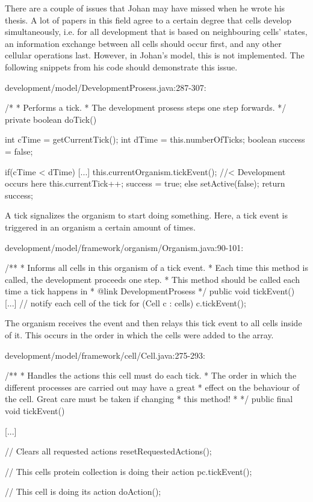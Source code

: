 There are a couple of issues that Johan may have missed when he wrote his thesis. A lot of papers in this field agree to a certain degree that cells develop simultaneously, i.e. for all development that is based on neighbouring cells' states, an information exchange between all cells should occur first, and any other cellular operations last. However, in Johan's model, this is not implemented. The following snippets from his code should demonstrate this issue.

\begin{verbatimtab}
development/model/DevelopmentProsess.java:287-307:

/*
 * Performs a tick.
 * The development prosess steps one step forwards.
 */
private boolean doTick() {
	int cTime = getCurrentTick();
	int dTime = this.numberOfTicks;
	boolean success = false;

	if(cTime < dTime) {
		[...]
		this.currentOrganism.tickEvent(); //< Development occurs here
		this.currentTick++;
		success = true;
	} else {
		setActive(false);
	}
	return success;
}
\end{verbatimtab}

A tick signalizes the organism to start doing something. Here, a tick event is triggered in an organism a certain amount of times.

\begin{verbatimtab}
development/model/framework/organism/Organism.java:90-101:

/**
 * Informs all cells in this organism of a tick event.
 * Each time this method is called, the development proceeds one step.
 * This method should be called each time a tick happens in
 * {@link DevelopmentProsess}
 */
public void tickEvent() {
	[...]
	// notify each cell of the tick
	for (Cell c : cells) {
		c.tickEvent();
	}
}
\end{verbatimtab}

The organism receives the event and then relays this tick event to all cells inside of it. This occurs in the order in which the cells were added to the array.

\begin{verbatimtab}
development/model/framework/cell/Cell.java:275-293:

/**
 * Handles the actions this cell must do each tick.
 * The order in which the different processes are carried out may have a great
 * effect on the behaviour of the cell. Great care must be taken if changing
 * this method!
 *
 */
public final void tickEvent() {
	[...]

	// Clears all requested actions
	resetRequestedActions();

	// This cells protein collection is doing their action
	pc.tickEvent();

	// This cell is doing its action
	doAction();
}
\end{verbatimtab}

